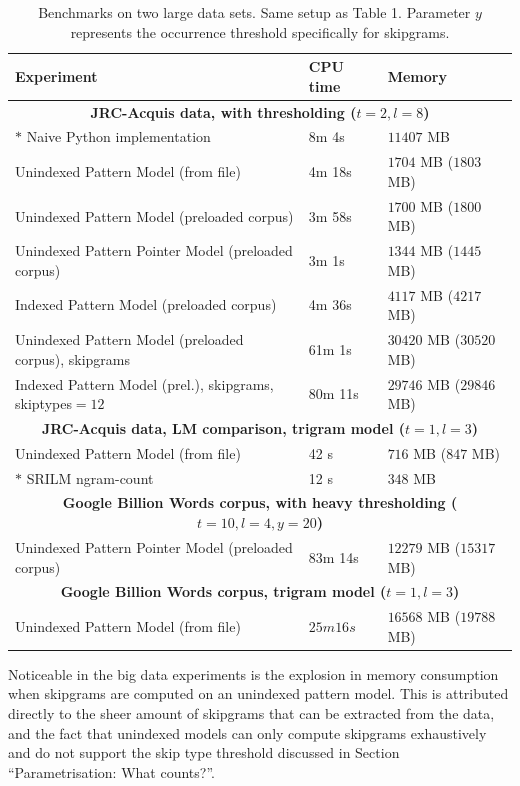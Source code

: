 \begin{table}[h]
\footnotesize{
\begin{tabular}{lll}
Experiment & CPU time & Memory  \\
\hline
\multicolumn{3}{c}{\textbf{JRC-Acquis data, with thresholding ($t=2,l=8$)}} \\
\hline
$\ast$ Naive Python implementation & 8m 4s & $11407$ MB \\
Unindexed Pattern Model (from file) & 4m 18s & $1704$ MB ($1803$ MB) \\
Unindexed Pattern Model (preloaded corpus) & 3m 58s & $1700$ MB ($1800$ MB) \\
Unindexed Pattern Pointer Model (preloaded corpus) & 3m 1s & $1344$ MB ($1445$ MB) \\
Indexed Pattern Model (preloaded corpus) &  4m 36s & $4117$ MB ($4217$ MB) \\
\hline
Unindexed Pattern Model (preloaded corpus), skipgrams & 61m 1s & $30420$ MB ($30520$ MB) \\
\hline
Indexed Pattern Model (prel.), skipgrams, skiptypes$=12$ & 80m 11s & $29746$ MB ($29846$ MB) \\
\hline
\multicolumn{3}{c}{\textbf{JRC-Acquis data, LM comparison, trigram model ($t=1,l=3$)}} \\
\hline
Unindexed Pattern Model (from file) & 42 s & $716$ MB ($847$ MB) \\
$\ast$ SRILM ngram-count & 12 s & $348$ MB  \\
\hline
\multicolumn{3}{c}{\textbf{Google Billion Words corpus, with heavy thresholding ($t=10,l=4,y=20$)}} \\
\hline
Unindexed Pattern Pointer Model (preloaded corpus) & 83m 14s & $12279$ MB ($15317$ MB) \\
\hline
\multicolumn{3}{c}{\textbf{Google Billion Words corpus, trigram model ($t=1,l=3$)}} \\
\hline
Unindexed Pattern Model (from file) & $25m 16s$ & $16568$ MB ($19788$ MB) \\
\end{tabular}
\caption{Benchmarks on two large data sets. Same setup as Table 1. Parameter $y$ represents the occurrence threshold specifically for skipgrams.}
}
\label{tab:bigbenchmarks}
\end{table}

Noticeable in the big data experiments is the explosion in memory consumption
when skipgrams are computed on an unindexed pattern model. This is attributed
directly to the sheer amount of skipgrams that can be extracted from the data,
and the fact that unindexed models can only compute skipgrams exhaustively and
do not support the skip type threshold discussed in Section ``Parametrisation:
What counts?''.

